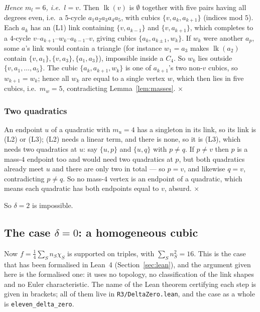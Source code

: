 \documentclass[11pt,reqno]{amsart}
\theoremstyle{plain}
\theoremstyle{definition}
\numberwithin{theorem}{section}
\newcommand{\lk}{\operatorname{lk}}
\begin{document}
\emph{Hence $m_l = 6$, i.e.\ $l = v$.} Then $\lk(v)$ is $\emptyset$ together with five pairs
having all degrees even, i.e.\ a $5$-cycle $a_1 a_2 a_3 a_4 a_5$, with cubics
$\{v, a_k, a_{k+1}\}$ (indices mod $5$). Each $a_k$ has an (L1) link containing
$\{v, a_{k-1}\}$ and $\{v, a_{k+1}\}$, which completes to a $4$-cycle
$v$--$a_{k+1}$--$w_k$--$a_{k-1}$--$v$, giving cubics $\{a_k, a_{k\pm1}, w_k\}$. If $w_k$ were
another $a_p$, some $a$'s link would contain a triangle (for instance $w_1 = a_3$ makes $\lk(a_2)$
contain $\{v,a_1\}, \{v,a_3\}, \{a_1,a_3\}$), impossible inside a $C_4$. So $w_k$ lies outside
$\{v, a_1, \dots, a_5\}$. The cubic $\{a_k, a_{k+1}, w_k\}$ is one of $a_{k+1}$'s two non-$v$
cubics, so $w_{k+1} = w_k$; hence all $w_k$ are equal to a single vertex $w$, which then lies in
five cubics, i.e.\ $m_w = 5$, contradicting Lemma~\ref{lem:masses}. \hfill$\times$

\subsubsection*{Two quadratics}
An endpoint $u$ of a quadratic with $m_u = 4$ has a singleton in its link, so its link is (L2) or
(L3); (L2) needs a linear term, and there is none, so it is (L3), which needs two quadratics at
$u$: say $\{u,p\}$ and $\{u,q\}$ with $p \ne q$. If $p \ne v$ then $p$ is a mass-$4$ endpoint too
and would need two quadratics at $p$, but both quadratics already meet $u$ and there are only
two in total --- so $p = v$, and likewise $q = v$, contradicting $p \ne q$. So no mass-$4$ vertex
is an endpoint of a quadratic, which means each quadratic has both endpoints equal to $v$, absurd.
\hfill$\times$

So $\delta = 2$ is impossible.

\subsection{The case \texorpdfstring{$\delta = 0$}{delta = 0}: a homogeneous cubic}
\label{app:delta0}

Now $f = \frac14\sum_S n_S \chi_S$ is supported on triples, with $\sum_S n_S^2 = 16$. This is
the case that has been formalised in Lean~4 (Section~\ref{sec:lean}), and the argument given
here is the formalised one: it uses no topology, no classification of the link shapes and no
Euler characteristic. The name of the Lean theorem certifying each step is given in brackets;
all of them live in \texttt{R3/DeltaZero.lean}, and the case as a whole is
\texttt{eleven\_delta\_zero}.
\end{document}
